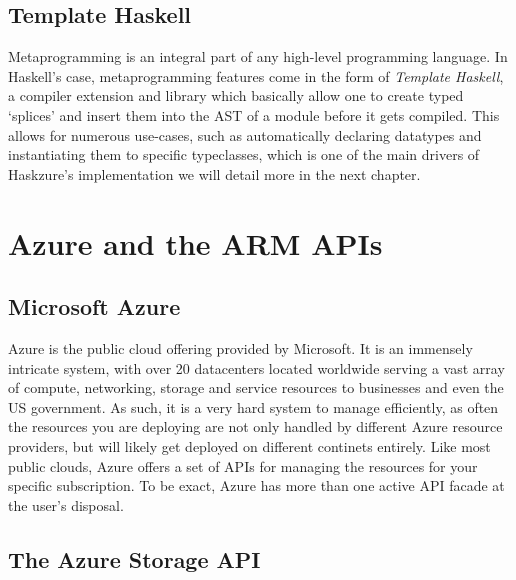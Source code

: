 \documentclass[11pt]{report}
\begin{document}
\subsection{Template Haskell}

Metaprogramming is an integral part of any high-level programming language. In
Haskell's case, metaprogramming features come in the form of \textit{Template
Haskell}, a compiler extension and library which basically allow one to create
typed `splices' and insert them into the AST of a module before it gets
compiled. This allows for numerous use-cases, such as automatically declaring
datatypes and instantiating them to specific typeclasses, which is one of the
main drivers of Haskzure's implementation we will detail more in the next
chapter.


\section{Azure and the ARM APIs}

\subsection{Microsoft Azure}

Azure is the public cloud offering provided by Microsoft. It is an immensely
intricate system, with over 20 datacenters located worldwide serving a vast
array of compute, networking, storage and service resources to businesses and
even the US government. As such, it is a very hard system to manage
efficiently, as often the resources you are deploying are not only handled by
different Azure resource providers, but will likely get deployed on different
continets entirely. \newline
Like most public clouds, Azure offers a set of APIs for managing the resources
for your specific subscription. To be exact, Azure has more than one active API
facade at the user's disposal.

\subsection{The Azure Storage API}
\end{document}
